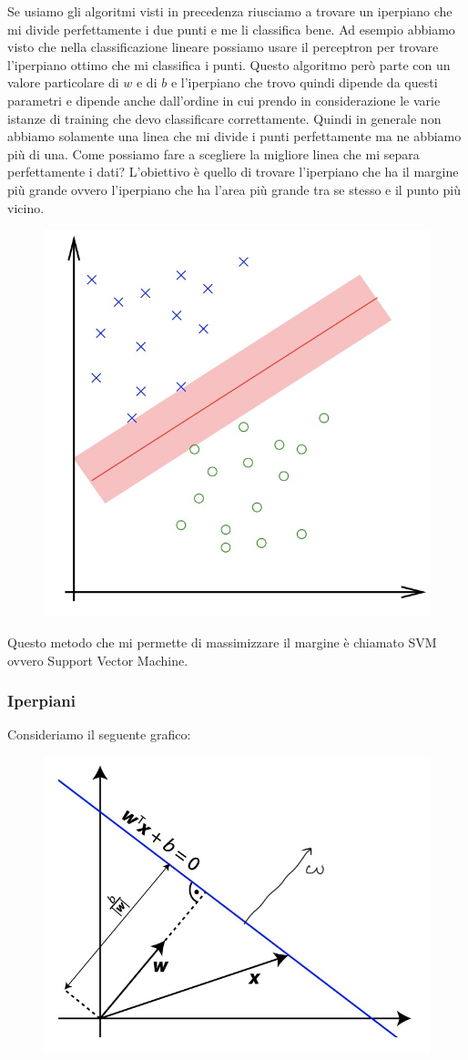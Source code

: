 \documentclass[14pt]{extreport}
\begin{document}
Se usiamo gli algoritmi visti in precedenza riusciamo a trovare un iperpiano che mi divide perfettamente i due punti e me li classifica bene. Ad
esempio abbiamo visto che nella classificazione lineare possiamo usare il perceptron per trovare l'iperpiano ottimo che mi classifica i punti. Questo
algoritmo però parte con un valore particolare di $w$ e di $b$ e l'iperpiano che trovo quindi dipende da questi parametri e dipende anche dall'ordine
in cui prendo in considerazione le varie istanze di training che devo classificare correttamente. Quindi in generale non abbiamo solamente una linea
che mi divide i punti perfettamente ma ne abbiamo più di una. Come possiamo fare a scegliere la migliore linea che mi separa perfettamente i dati?
L'obiettivo è quello di trovare l'iperpiano che ha il margine più grande ovvero l'iperpiano che ha l'area più grande tra se stesso e il punto più
vicino.

\begin{figure}[H]
\centering
\includegraphics[width=0.4\linewidth]{311.jpeg}
\end{figure}

Questo metodo che mi permette di massimizzare il margine è chiamato SVM ovvero Support Vector Machine.

\subsubsection{Iperpiani}

Consideriamo il seguente grafico:

\begin{figure}[H]
\centering
\includegraphics[width=0.4\linewidth]{312.jpeg}
\end{figure}
\end{document}
